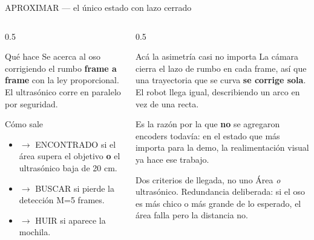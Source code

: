 \documentclass[aspectratio=169,10pt]{beamer}
\newcommand{\hacia}{$\rightarrow$}
\begin{document}
\begin{frame}{APROXIMAR --- el único estado con lazo cerrado}
  \begin{columns}[T,onlytextwidth]
    \begin{column}{0.5\textwidth}
      \begin{block}{Qué hace}
        \small Se acerca al oso corrigiendo el rumbo \textbf{frame a frame} con
        la ley proporcional. El ultrasónico corre en paralelo por seguridad.
      \end{block}
      \begin{block}{Cómo sale}
        \small
        \begin{itemize}
          \item \hacia{} ENCONTRADO si el área supera el objetivo \textbf{o} el
                ultrasónico baja de 20 cm.
          \item \hacia{} BUSCAR si pierde la detección M=5 frames.
          \item \hacia{} HUIR si aparece la mochila.
        \end{itemize}
      \end{block}
    \end{column}
    \begin{column}{0.5\textwidth}
      \begin{block}{Acá la asimetría casi no importa}
        \small
        La cámara cierra el lazo de rumbo en cada frame, así que una trayectoria
        que se curva \textbf{se corrige sola}. El robot llega igual, describiendo
        un arco en vez de una recta.
        \vspace{0.4em}

        Es la razón por la que \textbf{no} se agregaron encoders todavía: en el
        estado que más importa para la demo, la realimentación visual ya hace ese
        trabajo.
      \end{block}
      \begin{block}{Dos criterios de llegada, no uno}
        \small
        Área \emph{o} ultrasónico. Redundancia deliberada: si el oso es más chico
        o más grande de lo esperado, el área falla pero la distancia no.
      \end{block}
    \end{column}
  \end{columns}
\end{frame}
\end{document}
